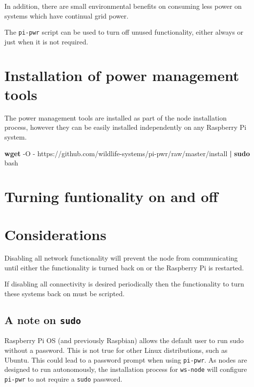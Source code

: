 \documentclass[
]{book}
\newenvironment{Shaded}{\begin{snugshade}}{\end{snugshade}}
\newcommand{\AttributeTok}[1]{\textcolor[rgb]{0.13,0.29,0.53}{#1}}
\newcommand{\FunctionTok}[1]{\textcolor[rgb]{0.13,0.29,0.53}{\textbf{#1}}}
\newcommand{\KeywordTok}[1]{\textcolor[rgb]{0.13,0.29,0.53}{\textbf{#1}}}
\newcommand{\NormalTok}[1]{#1}
\begin{document}
In addition, there are small environmental benefits on consuming less power on systems which have continual grid power.

The \texttt{pi-pwr} script can be used to turn off unused functionality, either always or just when it is not required.

\section{Installation of power management tools}\label{installation-of-power-management-tools}

The power management tools are installed as part of the node installation process, however they can be easily installed independently on any Raspberry Pi system.

\begin{Shaded}
\begin{Highlighting}[]
\FunctionTok{wget} \AttributeTok{{-}O} \AttributeTok{{-}}\NormalTok{ https://github.com/wildlife{-}systems/pi{-}pwr/raw/master/install }\KeywordTok{|} \FunctionTok{sudo}\NormalTok{ bash}
\end{Highlighting}
\end{Shaded}

\section{Turning funtionality on and off}\label{turning-funtionality-on-and-off}

\section{Considerations}\label{considerations}

Disabling all network functionality will prevent the node from communicating until either the functionality is turned back on or the Raspberry Pi is restarted.

If disabling all connectivity is desired periodically then the functionality to turn these systems back on must be scripted.

\subsection{\texorpdfstring{A note on \texttt{sudo}}{A note on sudo}}\label{a-note-on-sudo}

Raspberry Pi OS (and previously Raspbian) allows the default user to run sudo without a password. This is not true for other Linux distributions, such as Ubuntu. This could lead to a password prompt when using \texttt{pi-pwr}. As nodes are designed to run autonomously, the installation process for \texttt{ws-node} will configure \texttt{pi-pwr} to not require a \texttt{sudo} password.
\end{document}
